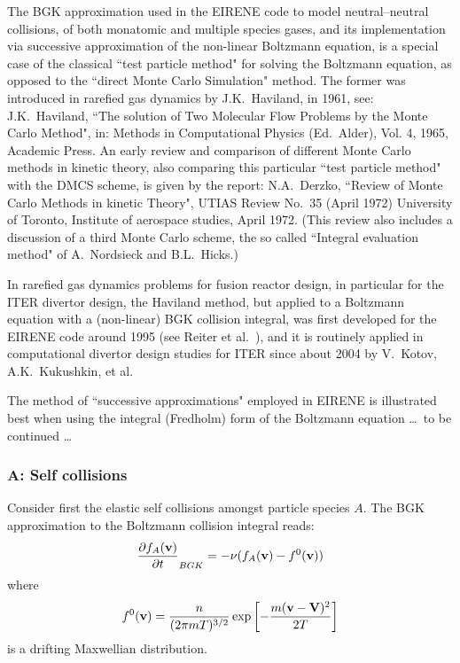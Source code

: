 The \ac{BGK} approximation used in the EIRENE code to model neutral--neutral
collisions, of both monatomic and multiple species gases, and its
implementation via successive approximation of the non-linear Boltzmann
equation, is a special case of the classical ``test particle method" for
solving the Boltzmann equation, as opposed to the ``direct Monte Carlo
Simulation" method.
The former was introduced in rarefied gas dynamics by J.K.~Haviland, in 1961,
see:
J.K.~Haviland, ``The solution of Two Molecular Flow Problems by the Monte Carlo
Method", in: Methods in Computational Physics (Ed.\ Alder), Vol.
4, 1965, Academic Press.
An early review and comparison of different Monte Carlo methods in kinetic
theory, also comparing this particular ``test particle method" with the
\ac{DMCS} scheme, is given by the report: N.A.~Derzko, ``Review of Monte Carlo
Methods in kinetic Theory", UTIAS Review No.\ 35 (April 1972) University of
Toronto, Institute of aerospace studies, April 1972.
(This review also includes a discussion of a third Monte Carlo scheme, the so
called ``Integral evaluation method" of A.~Nordsieck and B.L.~Hicks.)

In rarefied gas dynamics problems for fusion reactor design, in particular for
the ITER divertor design, the Haviland method, but applied to a Boltzmann
equation with a (non-linear) \ac{BGK} collision integral, was first developed
for the EIRENE code around 1995 (see Reiter et al.\ \cite{kn:Reiter96}), and it
is routinely applied in computational divertor design studies for ITER since
about 2004 by V.~Kotov, A.K.~Kukushkin, et al.

The method of ``successive approximations" employed in EIRENE is illustrated
best when using the integral (Fredholm) form of the Boltzmann equation \dots\
to be continued \dots 

\subsubsection{A: Self collisions} 

Consider first the elastic self collisions amongst particle species $A$.
The \ac{BGK} approximation to the Boltzmann collision integral reads:
\begin{equation}
  \frac{\partial f_A(\mathbf{v})}{\partial t}_{BGK}=-\nu (f_A(\mathbf{v})-f^0(\mathbf{v}))
\end{equation}
where
\begin{equation}
  f^0(\mathbf{v})=\frac{n}{(2\pi mT)^{3/2}} \exp\left[-\frac{m(\mathbf{v}-\mathbf{V})^2}{2T}\right]
\end{equation}
is a drifting Maxwellian distribution.

